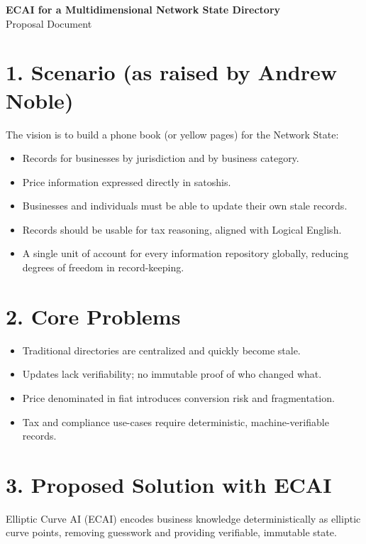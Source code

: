 \documentclass[11pt]{article}
\begin{document}
\begin{center}
    {\LARGE\bfseries ECAI for a Multidimensional Network State Directory}\\[4pt]
    {\large Proposal Document}
\end{center}

\section*{1. Scenario (as raised by Andrew Noble)}

The vision is to build a phone book (or yellow pages) for the Network State:
\begin{itemize}
  \item Records for businesses by jurisdiction and by business category.
  \item Price information expressed directly in satoshis.
  \item Businesses and individuals must be able to update their own stale records.
  \item Records should be usable for tax reasoning, aligned with Logical English.
  \item A single unit of account for every information repository globally, reducing degrees of freedom in record-keeping.
\end{itemize}

\section*{2. Core Problems}
\begin{itemize}
  \item Traditional directories are centralized and quickly become stale.
  \item Updates lack verifiability; no immutable proof of who changed what.
  \item Price denominated in fiat introduces conversion risk and fragmentation.
  \item Tax and compliance use-cases require deterministic, machine-verifiable records.
\end{itemize}

\section*{3. Proposed Solution with ECAI}

Elliptic Curve AI (ECAI) encodes business knowledge deterministically as elliptic curve points, removing guesswork and providing verifiable, immutable state.
\end{document}
